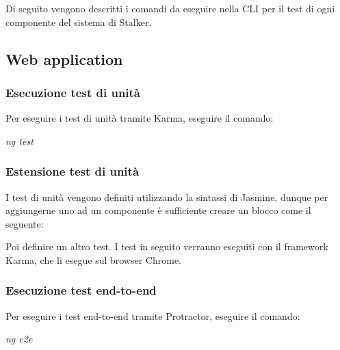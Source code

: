 \documentclass[../manuale-manutentore.tex]{subfiles}
\begin{document}
Di seguito vengono descritti i comandi da eseguire nella CLI per il test di ogni componente del sistema di Stalker.

\subsection{Web application}%
\label{sub:web_app_test}

\subsubsection{Esecuzione test di unità}%
\label{subs:esecuzione_test_di_unita}

Per eseguire i test di unità tramite Karma, eseguire il comando: \par\bigskip

\begin{center}
  \textit{ng test}
\end{center}
\par\bigskip

\subsubsection{Estensione test di unità}%
\label{subs:estensione_test_unita_webapp}

I test di unità vengono definiti utilizzando la sintassi di Jasmine, dunque per aggiungerne uno ad un componente è sufficiente creare un blocco come il seguente:

\newline
Poi definire un altro test.
I test in seguito verranno eseguiti con il framework Karma, che li esegue sul browser Chrome.

\subsubsection{Esecuzione test end-to-end}%
\label{subs:esecuzione_test_end_to_end}

Per eseguire i test end-to-end tramite Protractor, eseguire il comando: \par\bigskip

\begin{center}
  \textit{ng e2e}
\end{center}
\par\bigskip
\end{document}
